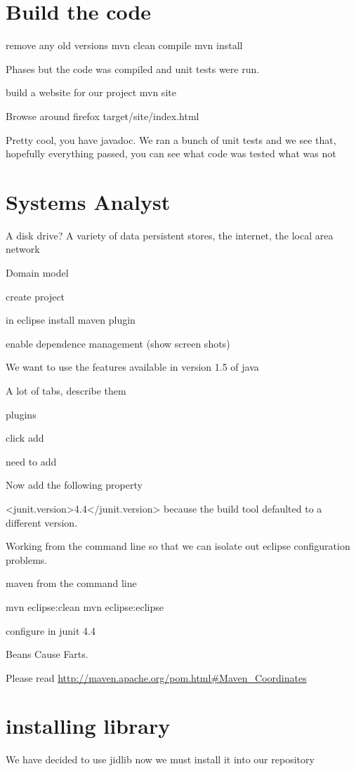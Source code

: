 \documentclass[a4paper,10pt]{book}
\begin{document}
\section{Build the code}
remove any old versions
mvn clean
compile
mvn install

Phases but the code was compiled and unit tests were run.

build a website for our project
mvn site

Browse around
firefox target/site/index.html

Pretty cool, you have javadoc. We ran a bunch of unit tests and we see that, hopefully everything passed,  you can see what code was tested what was not

\section{Systems Analyst}
A disk drive?  A variety of data persistent stores, the internet, the local area network

Domain model

create project 

in eclipse install maven plugin

enable dependence management (show screen shots)

We want to use the features available in version 1.5 of java

A lot of tabs, describe them



plugins

click add

need to add 

Now add the following property

    <junit.version>4.4</junit.version>
because the build tool defaulted to a different version.

Working from the command line so that we can isolate out eclipse configuration problems.

maven from the command line

mvn eclipse:clean
mvn eclipse:eclipse

configure in junit 4.4
 \begin{minipage}[b]{1.5in}
  Beans Cause Farts.
 \end{minipage}

Please read \url{http://maven.apache.org/pom.html#Maven_Coordinates}

\section{installing library}
We have decided to use jidlib now we must install it into our repository
\end{document}
